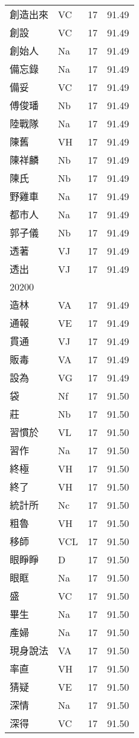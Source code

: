 \documentclass[twocolumn]{book}
\begin{document}
\begin{supertabular}{llrr}
創造出來 & VC & 17 &  91.49\\
創設 & VC & 17 &  91.49\\
創始人 & Na & 17 &  91.49\\
備忘錄 & Na & 17 &  91.49\\
備妥 & VC & 17 &  91.49\\
傅俊璠 & Nb & 17 &  91.49\\
陸戰隊 & Na & 17 &  91.49\\
陳舊 & VH & 17 &  91.49\\
陳祥麟 & Nb & 17 &  91.49\\
陳氏 & Nb & 17 &  91.49\\
野雞車 & Na & 17 &  91.49\\
都市人 & Na & 17 &  91.49\\
郭子儀 & Nb & 17 &  91.49\\
透著 & VJ & 17 &  91.49\\
透出 & VJ & 17 &  91.49\\
20200\\
造林 & VA & 17 &  91.49\\
通報 & VE & 17 &  91.49\\
貫通 & VJ & 17 &  91.49\\
販毒 & VA & 17 &  91.49\\
設為 & VG & 17 &  91.49\\
袋 & Nf & 17 &  91.50\\
莊 & Nb & 17 &  91.50\\
習慣於 & VL & 17 &  91.50\\
習作 & Na & 17 &  91.50\\
終極 & VH & 17 &  91.50\\
終了 & VH & 17 &  91.50\\
統計所 & Nc & 17 &  91.50\\
粗魯 & VH & 17 &  91.50\\
移師 & VCL & 17 &  91.50\\
眼睜睜 & D & 17 &  91.50\\
眼眶 & Na & 17 &  91.50\\
盛 & VC & 17 &  91.50\\
畢生 & Na & 17 &  91.50\\
產婦 & Na & 17 &  91.50\\
現身說法 & VA & 17 &  91.50\\
率直 & VH & 17 &  91.50\\
猜疑 & VE & 17 &  91.50\\
深情 & Na & 17 &  91.50\\
深得 & VC & 17 &  91.50\\

\end{supertabular}
\end{document}
